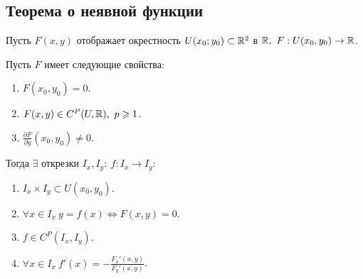 \setcounter{subsection}{15}

\subsection{Теорема о неявной функции}

\begin{theorem}\label{theorem:1}
    Пусть $ F(x,y) $ отображает окрестность $ U(x_0;y_0) \subset \mathbb{R}^2 $ в $ \R, \ F:U(x_0,y_0)\rightarrow\R $.

    Пусть $ F $ имеет следующие свойства:
    \begin{enumerate}
        \item $ F(x_0,y_0) = 0 $.
        \item $ F(x,y) \in C^P(U,\mathbb{R}), \ p \geqslant 1 $.
        \item $ \frac{\partial F}{\partial y}(x_0,y_0)\ne 0 $.
    \end{enumerate}

    Тогда $ \exists $ открезки $ I_x,I_y: \ f:I_x \rightarrow I_y $:
    \begin{enumerate}
        \item $ I_x \times I_y \subset U(x_0,y_0) $.
        \item $ \forall x \in I_x \ y = f(x) \iff F(x,y) = 0 $.
        \item $ f \in C^P(I_x,I_y) $.
        \item $ \forall x \in I_x \ f'(x) = -\frac{F_x'(x,y)}{F_y'(x,y)} $.
    \end{enumerate}
\end{theorem}

